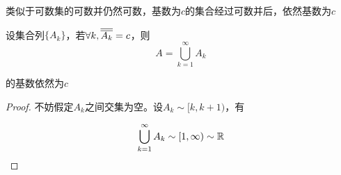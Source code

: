类似于可数集的可数并仍然可数，基数为$c$的集合经过可数并后，依然基数为$c$

\begin{theorem}
    设集合列$\{A_k\}$，若$\forall k,\overline{\overline{A_k}}=c$，则
    \begin{equation*}
        A = \bigcup_{k=1}^{\infty}A_k
    \end{equation*}

    的基数依然为$c$
\end{theorem}

\begin{proof}
    不妨假定$A_k$之间交集为空。设$A_k\sim[k,k+1)$，有

    \begin{equation*}
        \bigcup_{k=1}^{\infty}A_k\sim[1,\infty)\sim \mathbb{R}
    \end{equation*}
    \qde
\end{proof}